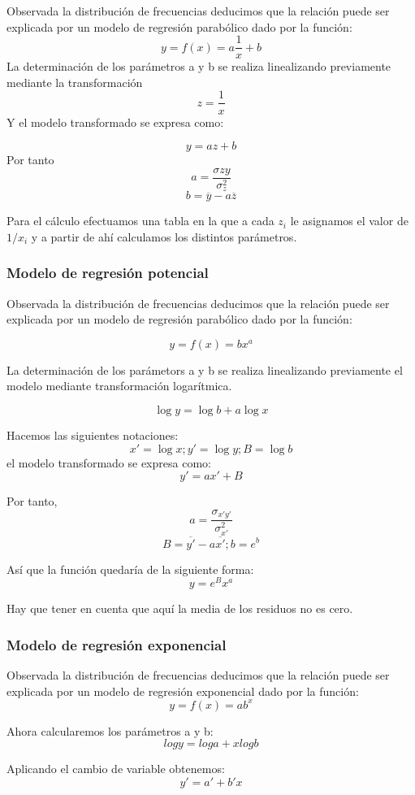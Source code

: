 \documentclass{article}
\theoremstyle{definition}
\begin{document}
Observada la distribución de frecuencias deducimos que la relación puede ser
explicada por un modelo de regresión parabólico dado por la función: $$ y= f(x) =
a\frac{1}{x} + b $$ La determinación de los parámetros a y b se realiza
linealizando previamente mediante la transformación  $$ z = \frac{1}{x} $$ Y el
modelo transformado se expresa como:

$$ y = az +b $$ Por tanto $$ a = \frac{\sigma{zy} }{\sigma_{z}^2} $$  $$ b =
\overline{y} - a \overline{z} $$

Para el cálculo efectuamos una tabla en la que a cada $z_i$ le asignamos el
valor de $1/x_i$ y a partir de ahí calculamos los distintos parámetros.

\subsubsection{Modelo de regresión potencial}

Observada la distribución de frecuencias deducimos que la relación puede ser
explicada por un modelo de regresión parabólico dado por la función:

$$ y = f(x) = bx^a $$

La determinación de los parámetors a y b se realiza linealizando previamente el
modelo mediante transformación logarítmica.

$$ \log y = \log b + a\log x $$

	Hacemos las siguientes notaciones: $$x' = \log x; y' = \log y ; B = \log b $$
	el modelo transformado se expresa como: $$y' = ax' + B $$

	Por tanto,
	$$ a = \frac{\sigma_{x'y'} }{\sigma_{x'}^2}$$
	$$ B = \overline{y'} - a\overline{x'} ; b = e^{b} $$

  Así que la función quedaría de la siguiente forma:
	$$ y = e^{B}x^{a} $$

	Hay que tener en cuenta que aquí la media de los residuos no es cero.

\subsubsection{Modelo de regresión exponencial}
	Observada la distribución de frecuencias deducimos que la relación puede ser explicada por un modelo de regresión exponencial dado por la función:
  $$ y = f(x) = ab^{x} $$

	Ahora calcularemos los parámetros a y b:
	$$ log y = log a + xlog b $$

	Aplicando el cambio de variable obtenemos:
	$$ y' = a' + b'x $$
\end{document}
